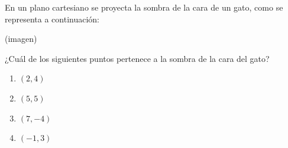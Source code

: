 \begin{problem}
    En un plano cartesiano se proyecta la sombra de la cara de un gato, como se representa a continuación:

    \begin{center}
    (imagen)
    \end{center}

    ¿Cuál de los siguientes puntos pertenece a la sombra de la cara del gato?

    \begin{enumerate}[label=\Alph*.]
        \item $(2, 4)$
        \item $(5, 5)$
        \item $(7, -4)$
        \item $(-1, 3)$
    \end{enumerate}
\end{problem}
